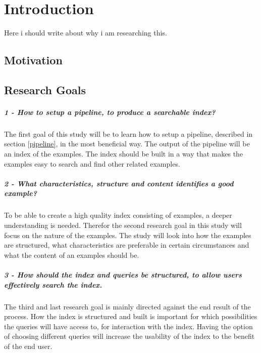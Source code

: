 
\chapter{Introduction}

Here i should write about why i am researching this.

\section{Motivation}

\section{Research Goals}

\paragraph{1 - How to setup a pipeline, to produce a searchable index?}
The first goal of this study will be to learn how to setup a pipeline, described in section \ref{pipeline}, in the most beneficial way. The output of the pipeline will be an index of the examples. The index should be built in a way that makes the examples easy to search and find other related examples.

\paragraph{2 - What characteristics, structure and content identifies a good example?}
To be able to create a high quality index consisting of examples, a deeper understanding is needed. Therefor the second research goal in this study will focus on the nature of the examples. The study will look into how the examples are structured, what characteristics are preferable in certain circumstances and what the content of an examples should be. 

\paragraph{3 - How should the index and queries be structured, to allow users effectively search the index.}
The third and last research goal is mainly directed against the end result of the process. How the index is structured and built is important for which possibilities the queries will have access to, for interaction with the index. Having the option of choosing different queries will increase the usability of the index to the benefit of the end user. 



\cleardoublepage